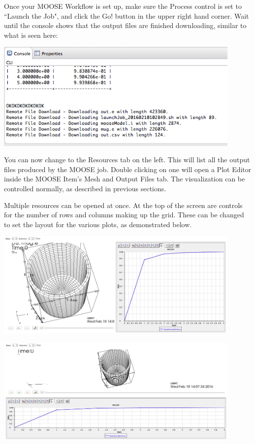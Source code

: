 \documentclass{article}
\begin{document}
Once your MOOSE Workflow is set up, make sure the Process control is set to
``Launch the Job", and click the Go! button in the upper right hand corner. Wait
until the console shows that the output files are finished downloading, similar
to what is seen here:

\begin{center} 
\includegraphics[width=12cm]{images/MOOSEJobConsoleOutput} 
\end{center}

You can now change to the Resources tab on the left. This will list all the
output files produced by the MOOSE job. Double clicking on one will open a Plot
Editor inside the MOOSE Item's Mesh and Output Files tab. The visualization can
be controlled normally, as described in previous sections.  

Multiple resources can be opened at once. At the top of the screen are controls
for the number of rows and columns making up the grid. These can be changed to
set the layout for the various plots, as demonstrated below.

\begin{center}
\includegraphics[width=12cm]{images/MOOSEEmbeddedHorizontal}
\end{center}

\begin{center}
\includegraphics[width=12cm]{images/MOOSEEmbeddedVertical}
\end{center}
\end{document}
